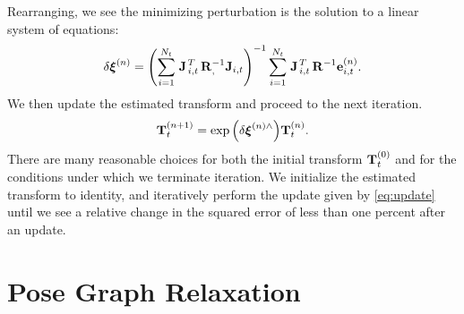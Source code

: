 Rearranging, we see the minimizing perturbation is the solution to a
linear system of equations:
\begin{equation}
  \delta\boldsymbol{\mathbf{\xi}}^{(n)} = 
  \left( \sum_{i=1}^{N_t} \left.{\boldsymbol{\mathbf{J}}}\right.^T_{i,t}
  \boldsymbol{\mathbf{R}}_{,}^{-1} \boldsymbol{\mathbf{J}}_{i,t} \right)^{-1}
  \sum_{i=1}^{N_t} \left.{\boldsymbol{\mathbf{J}}}\right.^T_{i,t}
  \boldsymbol{\mathbf{R}}^{-1} \boldsymbol{\mathbf{e}}_{i,t}^{(n)}. 
\label{eq:least-squares-iteration}
\end{equation}
We then update the estimated transform and proceed to the next iteration.
\begin{equation}
  \boldsymbol{\mathbf{T}}_t^{(n+1)} = \exp{\left( \delta \boldsymbol{\mathbf{\xi}} ^{(n)\wedge}
  \right)} \boldsymbol{\mathbf{T}}_t^{(n)}. \label{eq:update}
\end{equation}
There are many reasonable choices for both the initial transform
$\boldsymbol{\mathbf{T}}_t^{(0)}$ and for the conditions under which we terminate
iteration. We initialize the estimated transform to identity, and iteratively
perform the update given by \cref{eq:update} until we see a relative change in
the squared error of less than one percent after an update. 


\section{Pose Graph Relaxation}

